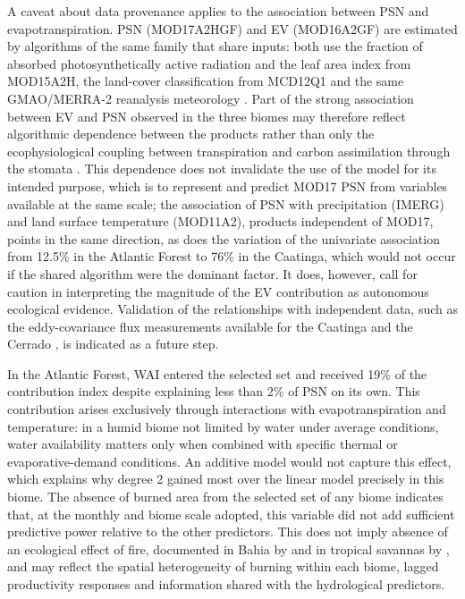 \documentclass[a4paper,fleqn]{cas-sc}
\begin{document}
A caveat about data provenance applies to the association between PSN and evapotranspiration. PSN (MOD17A2HGF) and EV (MOD16A2GF) are estimated by algorithms of the same family that share inputs: both use the fraction of absorbed photosynthetically active radiation and the leaf area index from MOD15A2H, the land-cover classification from MCD12Q1 and the same GMAO/MERRA-2 reanalysis meteorology \citep{running2004,running2021gpp,running2021et}. Part of the strong association between EV and PSN observed in the three biomes may therefore reflect algorithmic dependence between the products rather than only the ecophysiological coupling between transpiration and carbon assimilation through the stomata \citep{lawson2019}. This dependence does not invalidate the use of the model for its intended purpose, which is to represent and predict MOD17 PSN from variables available at the same scale; the association of PSN with precipitation (IMERG) and land surface temperature (MOD11A2), products independent of MOD17, points in the same direction, as does the variation of the univariate association from 12.5\% in the Atlantic Forest to 76\% in the Caatinga, which would not occur if the shared algorithm were the dominant factor. It does, however, call for caution in interpreting the magnitude of the EV contribution as autonomous ecological evidence. Validation of the relationships with independent data, such as the eddy-covariance flux measurements available for the Caatinga \citep{mendes2020,mendes2025} and the Cerrado \citep{vourlitis2022}, is indicated as a future step.

In the Atlantic Forest, WAI entered the selected set and received 19\% of the contribution index despite explaining less than 2\% of PSN on its own. This contribution arises exclusively through interactions with evapotranspiration and temperature: in a humid biome not limited by water under average conditions, water availability matters only when combined with specific thermal or evaporative-demand conditions. An additive model would not capture this effect, which explains why degree 2 gained most over the linear model precisely in this biome. The absence of burned area from the selected set of any biome indicates that, at the monthly and biome scale adopted, this variable did not add sufficient predictive power relative to the other predictors. This does not imply absence of an ecological effect of fire, documented in Bahia by \citet{benfica2022,benfica2023} and in tropical savannas by \citet{navarro2025}, and may reflect the spatial heterogeneity of burning within each biome, lagged productivity responses and information shared with the hydrological predictors.
\end{document}
